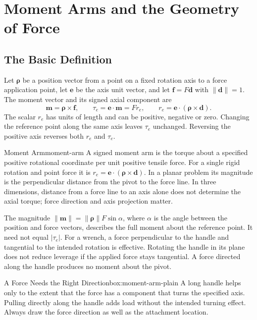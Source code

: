 \section{Moment Arms and the Geometry of Force}
\label{sec:moment-arms}

\subsection{The Basic Definition}

Let $\bm\rho$ be a position vector from a point on a fixed rotation axis to a force application point, let $\bm e$ be the axis unit vector, and let $\bm f=F\bm d$ with $\|\bm d\|=1$. The moment vector and its signed axial component are
\[
\bm m=\bm\rho\times\bm f,\qquad
\tau_e=\bm e\cdot\bm m=F r_e,\qquad
r_e=\bm e\cdot(\bm\rho\times\bm d).
\]
The scalar $r_e$ has units of length and can be positive, negative or zero. Changing the reference point along the same axis leaves $\tau_e$ unchanged. Reversing the positive axis reverses both $r_e$ and $\tau_e$.

\begin{definition}{Moment Arm}{moment-arm}
A signed moment arm is the torque about a specified positive rotational coordinate per unit positive tensile force. For a single rigid rotation and point force it is $r_e=\bm e\cdot(\bm\rho\times\bm d)$. In a planar problem its magnitude is the perpendicular distance from the pivot to the force line. In three dimensions, distance from a force line to an axis alone does not determine the axial torque; force direction and axis projection matter.
\end{definition}

The magnitude $\|\bm m\|=\|\bm\rho\|F\sin\alpha$, where $\alpha$ is the angle between the position and force vectors, describes the full moment about the reference point. It need not equal $|\tau_e|$. For a wrench, a force perpendicular to the handle and tangential to the intended rotation is effective. Rotating the handle in its plane does not reduce leverage if the applied force stays tangential. A force directed along the handle produces no moment about the pivot.

\begin{laymansbox}{A Force Needs the Right Direction}{box:moment-arm-plain}
A long handle helps only to the extent that the force has a component that turns the specified axis. Pulling directly along the handle adds load without the intended turning effect. Always draw the force direction as well as the attachment location.
\end{laymansbox}

